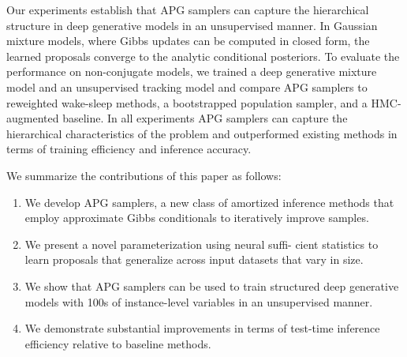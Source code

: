 \documentclass{article}
\theoremstyle{definition}
\begin{document}
Our experiments establish that APG samplers can capture the hierarchical structure in deep generative models in an unsupervised manner.
In Gaussian mixture models, where Gibbs updates can be computed in closed form, the learned proposals converge to the analytic conditional posteriors.
To evaluate the performance on non-conjugate models, we trained a deep generative mixture model and an unsupervised tracking model and compare APG samplers to reweighted wake-sleep methods, a bootstrapped population sampler, and a HMC-augmented baseline.
In all experiments APG samplers can capture the hierarchical characteristics of the problem and outperformed existing methods in terms of training efficiency and inference accuracy.

We summarize the contributions of this paper as follows: 
\begin{enumerate}[labelwidth=0.5em,labelsep=0.5em,leftmargin=1.0em,topsep=0em,itemsep=\parsep]
    \item We develop APG samplers, a new class of amortized inference methods that employ approximate Gibbs conditionals to iteratively improve samples.
    \item We present a novel parameterization using neural suffi- cient statistics to learn proposals that generalize across input datasets that vary in size.
    \item We show that APG samplers can be used to train structured deep generative models with 100s of instance-level variables in an unsupervised manner.
    \item We demonstrate substantial improvements in terms of test-time inference efficiency relative to baseline methods.
\end{enumerate}


\end{document}
